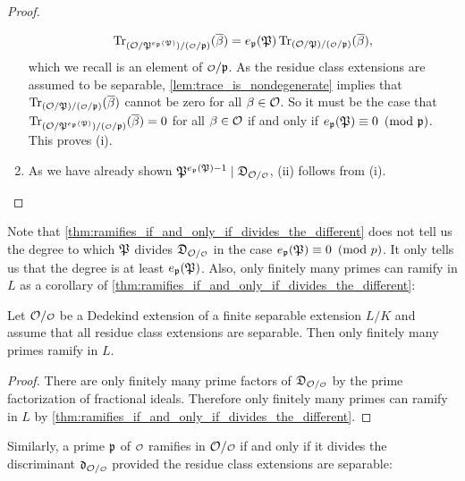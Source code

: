 \begin{proof}
\begin{enumerate}[label=(\roman*)]
        \[
          \Trace_{(\mc{O}/\mf{P}^{e_{\mf{p}}(\mf{P})})/(\smc{O}/\mf{p})}(\conj{\b}) = e_{\mf{p}}(\mf{P})\Trace_{(\mc{O}/\mf{P})/(\smc{O}/\mf{p})}(\conj{\b}),
        \]
        which we recall is an element of $\smc{O}/\mf{p}$. As the residue class extensions are assumed to be separable, \cref{lem:trace_is_nondegenerate} implies that $\Trace_{(\mc{O}/\mf{P})/(\smc{O}/\mf{p})}(\conj{\b})$ cannot be zero for all $\beta \in \mathcal{O}$. So it must be the case that $\Trace_{(\mc{O}/\mf{P}^{e_{\mf{p}}(\mf{P})})/(\smc{O}/\mf{p})}(\conj{\b}) = 0$ for all $\beta \in \mathcal{O}$ if and only if $e_{\mathfrak{p}}(\mathfrak{P}) \equiv 0 \ \left(\text{mod }\mathfrak{p}\right)$. This proves (i).
        \item As we have already shown $\mf{P}^{e_{\mf{p}}(\mf{P})-1} \mid \mf{D}_{\mc{O}/\smc{O}}$, (ii) follows from (i).
      \end{enumerate}
    \end{proof}

    Note that \cref{thm:ramifies_if_and_only_if_divides_the_different} does not tell us the degree to which $\mathfrak{P}$ divides $\mf{D}_{\mc{O}/\smc{O}}$ in the case $e_{\mathfrak{p}}(\mathfrak{P}) \equiv 0 \ \left(\text{mod }p\right)$. It only tells us that the degree is at least $e_{\mathfrak{p}}(\mathfrak{P})$. Also, only finitely many primes can ramify in $L$ as a corollary of \cref{thm:ramifies_if_and_only_if_divides_the_different}:

    \begin{corollary}\label{cor:finitely_many_primes_ramify_L}
      Let $\mc{O}/\smc{O}$ be a Dedekind extension of a finite separable extension $L/K$ and assume that all residue class extensions are separable. Then only finitely many primes ramify in $L$.
    \end{corollary}
    \begin{proof}
      There are only finitely many prime factors of $\mf{D}_{\mc{O}/\smc{O}}$ by the prime factorization of fractional ideals. Therefore only finitely many primes can ramify in $L$ by \cref{thm:ramifies_if_and_only_if_divides_the_different}.
    \end{proof}

    Similarly, a prime $\mathfrak{p}$ of $\smc{O}$ ramifies in $\mc{O}/\smc{O}$ if and only if it divides the discriminant $\mf{d}_{\mc{O}/\smc{O}}$ provided the residue class extensions are separable:

